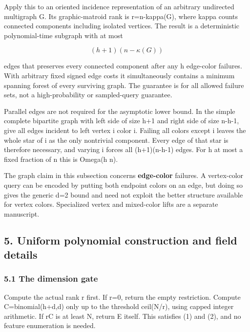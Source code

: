 Apply this to an oriented incidence representation of an arbitrary undirected multigraph G. Its graphic-matroid rank is r=n-kappa(G), where kappa counts connected components including isolated vertices. The result is a deterministic polynomial-time subgraph with at most

\[
(h+1)(n-\kappa(G))
 \tag{16}
\]

edges that preserves every connected component after any h edge-color failures. With arbitrary fixed signed edge costs it simultaneously contains a minimum spanning forest of every surviving graph. The guarantee is for all allowed failure sets, not a high-probability or sampled-query guarantee.

Parallel edges are not required for the asymptotic lower bound. In the simple complete bipartite graph with left side of size h+1 and right side of size n-h-1, give all edges incident to left vertex i color i. Failing all colors except i leaves the whole star of i as the only nontrivial component. Every edge of that star is therefore necessary, and varying i forces all (h+1)(n-h-1) edges. For h at most a fixed fraction of n this is Omega(h n).

The graph claim in this subsection concerns \textbf{edge-color} failures. A vertex-color query can be encoded by putting both endpoint colors on an edge, but doing so gives the generic d=2 bound and need not exploit the better structure available for vertex colors. Specialized vertex and mixed-color lifts are a separate manuscript.

\hypertarget{af-7a1626f5ae-uniform-polynomial-construction-and-field-details}{%
\subsection{5. Uniform polynomial construction and field details}\label{af-7a1626f5ae-uniform-polynomial-construction-and-field-details}}

\hypertarget{af-7a1626f5ae-the-dimension-gate}{%
\subsubsection{5.1 The dimension gate}\label{af-7a1626f5ae-the-dimension-gate}}

Compute the actual rank r first. If r=0, return the empty restriction. Compute C=binomial(h+d,d) only up to the threshold ceil(N/r), using capped integer arithmetic. If rC is at least N, return E itself. This satisfies (1) and (2), and no feature enumeration is needed.

